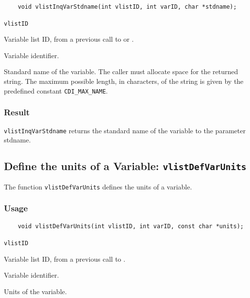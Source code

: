 \begin{verbatim}
    void vlistInqVarStdname(int vlistID, int varID, char *stdname);
\end{verbatim}

\hspace*{4mm}\begin{minipage}[]{15cm}
\begin{deflist}{\texttt{vlistID}\ }
\item[\texttt{vlistID}]
Variable list ID, from a previous call to {} or {}.
\item[\texttt{varID}]
Variable identifier.
\item[\texttt{stdname}]
Standard name of the variable. The caller must allocate space for the
                    returned string. The maximum possible length, in characters, of
                    the string is given by the predefined constant {\texttt{CDI\_MAX\_NAME}}.

\end{deflist}
\end{minipage}

\subsubsection*{Result}

{\texttt{vlistInqVarStdname}} returns the standard name of the variable to the parameter stdname.



\subsection{Define the units of a Variable: \texttt{vlistDefVarUnits}}
\label{vlistDefVarUnits}

The function {\texttt{vlistDefVarUnits}} defines the units of a variable.

\subsubsection*{Usage}

\begin{verbatim}
    void vlistDefVarUnits(int vlistID, int varID, const char *units);
\end{verbatim}

\hspace*{4mm}\begin{minipage}[]{15cm}
\begin{deflist}{\texttt{vlistID}\ }
\item[\texttt{vlistID}]
Variable list ID, from a previous call to {}.
\item[\texttt{varID}]
Variable identifier.
\item[\texttt{units}]
Units of the variable.

\end{deflist}
\end{minipage}


